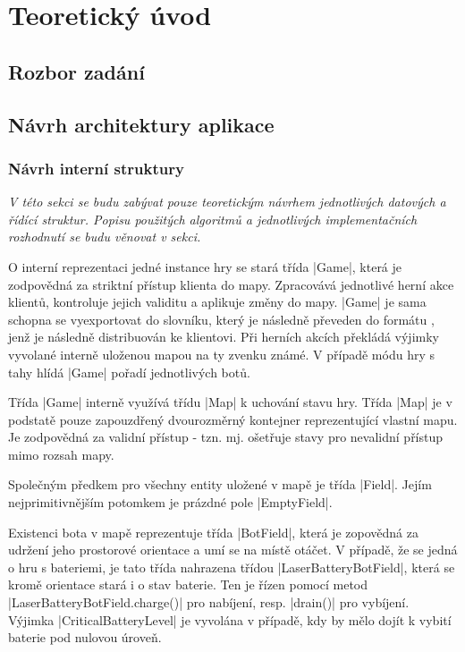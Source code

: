 
\section{Teoretický úvod}

\subsection{Rozbor zadání}
\subsection{Návrh architektury aplikace}

\subsubsection{Návrh interní struktury}

\textit{
	V této sekci se budu zabývat pouze teoretickým návrhem jednotlivých datových a řídící struktur. Popisu použitých algoritmů a jednotlivých implementačních rozhodnutí se budu věnovat v sekci.
}

O interní reprezentaci jedné instance hry se stará třída \ic|Game|, která je zodpovědná za striktní přístup klienta do mapy. Zpracovává jednotlivé herní akce klientů, kontroluje jejich validitu a aplikuje změny do mapy. \ic|Game| je sama schopna se vyexportovat do slovníku, který je následně převeden do formátu , jenž je následně distribuován ke klientovi. Při herních akcích překládá výjimky vyvolané interně uloženou mapou na ty zvenku známé. V případě módu hry s tahy hlídá \ic|Game| pořadí jednotlivých botů.

Třída \ic|Game| interně využívá třídu \ic|Map| k uchování stavu hry. Třída \ic|Map| je v podstatě pouze zapouzdřený dvourozměrný kontejner reprezentující vlastní mapu. Je zodpovědná za validní přístup - tzn. mj. ošetřuje stavy pro nevalidní přístup mimo rozsah mapy.

Společným předkem pro všechny entity uložené v mapě je třída \ic|Field|. Jejím nejprimitivnějším potomkem je prázdné pole \ic|EmptyField|.

\begin{sloppypar}
	Existenci bota v mapě reprezentuje třída \ic|BotField|, která je zopovědná za udržení jeho prostorové orientace a umí se na místě otáčet. V případě, že se jedná o hru s bateriemi, je tato třída nahrazena třídou \ic|LaserBatteryBotField|, která se kromě orientace stará i o stav baterie. Ten je řízen pomocí metod \ic|LaserBatteryBotField.charge()| pro nabíjení, resp. \ic|drain()| pro vybíjení. Výjimka \ic|CriticalBatteryLevel| je vyvolána v případě, kdy by mělo dojít k vybití baterie pod nulovou úrove\v{n}.
\end{sloppypar}

